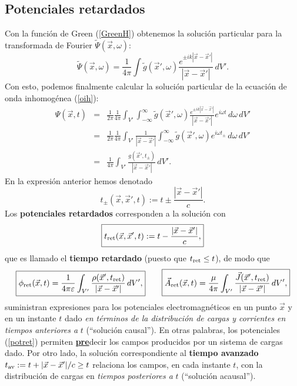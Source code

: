 \subsection{Potenciales retardados}
Con la función de Green (\ref{GreenH}) obtenemos la solución particular para la
transformada de Fourier $\tilde{\Psi}(\vec{x},\omega)$:
\begin{equation}
\tilde{\Psi}(\vec{x},\omega)=\frac{1}{4\pi}\int
\tilde{g}(\vec{x}',\omega)\frac{e^{\pm
ik|\vec{x}-\vec{x}'|}}{|\vec{x}-\vec{x}'|}\,dV' .
\end{equation}
Con esto, podemos finalmente calcular la solución particular de la ecuación de
onda inhomogénea (\ref{oih}):
\begin{eqnarray}
\Psi(\vec{x},t)&=&\frac{1}{2\pi}\frac{1}{4\pi}\int_{V'}\int_{-\infty}
^\infty \tilde{g}(\vec{x}',\omega)\frac{e^{\pm
ik|\vec{x}-\vec{x}'|}}{|\vec{x}-\vec{x}'|}e^{i\omega t}\,d\omega\,dV'  \\
&=&\frac{1}{2\pi}\frac{1}{4\pi}\int_{V'}\frac{1}{|\vec{x}-\vec{x}'|}\int_
{-\infty}^\infty \tilde{g}(\vec{x}',\omega)e^{i\omega t_{\pm}}\,d\omega \,dV' \\
&=&\frac{1}{4\pi}\int_{V'} \frac{g(\vec{x}',t_{\pm})}{|\vec{x}-\vec{x}'|}\,dV' .
\end{eqnarray}
En la expresión anterior hemos denotado
\begin{equation}
t_{\pm}(\vec{x},\vec{x}',t):=t\pm \frac{|\vec{x}-\vec{x}'|}{c}.
\end{equation}
Los \textbf{potenciales retardados} corresponden a la solución con
\begin{equation}
\boxed{t_{\rm ret}(\vec{x},\vec{x}',t):=t-\frac{|\vec{x}-\vec{x}'|}{c},} \label{deftret}
\end{equation}
que es llamado el \textbf{tiempo retardado} (puesto que $t_{\rm ret}\le t$), de modo que
\begin{equation}
\boxed{\phi_{\rm ret}(\vec{x},t)=\frac{1}{4\pi\varepsilon}\int_{V'}
\frac{\rho(\vec{x}',t_{\rm ret})}{|\vec{x}-\vec{x}'|}\,dV',} \qquad \boxed{\vec{A}_{\rm
ret}(\vec{x},t)=\frac{\mu}{4\pi}\int_{V'}
\frac{\vec{J}(\vec{x}',t_{\rm ret})}{|\vec{x}-\vec{x}'|}\,dV' ,} \label{potret}
\end{equation}
suministran expresiones para los potenciales electromagnéticos en un punto
$\vec{x}$ y en un instante $t$ dado \textit{en términos de la distribución de cargas y corrientes en tiempos anteriores a} $t$ (``solución causal''). En otras palabras, los potenciales (\ref{potret}) permiten \underline{\textbf{pre}}decir los campos producidos por un sistema de cargas dado. Por otro lado, la solución correspondiente al \textbf{tiempo avanzado} $t_{\rm av}:=t+{|\vec{x}-\vec{x}'|}/{c}\ge t$ relaciona los campos, en cada instante $t$, con la distribución de cargas en \textit{tiempos posteriores a }$t$ (``solución acausal'').

